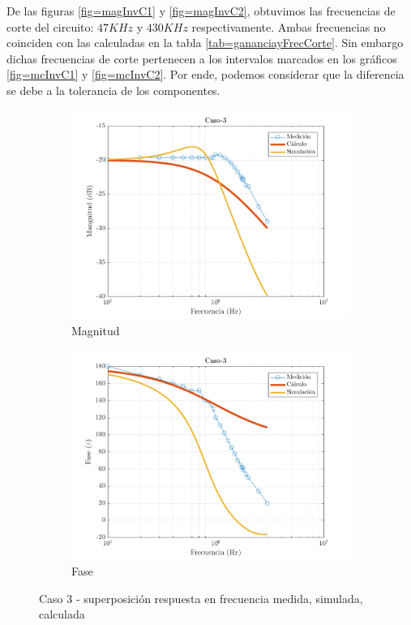 \documentclass[../../main.tex]{subfiles}
\begin{document}
De las figuras \ref{fig=magInvC1} y \ref{fig=magInvC2}, obtuvimos las frecuencias de corte del circuito: $47KHz$ y $430KHz$ respectivamente.  Ambas frecuencias no coinciden con las calculadas en la tabla \ref{tab=gananciayFrecCorte}. Sin embargo dichas frecuencias de corte pertenecen a los intervalos marcados en los gráficos \ref{fig=mcInvC1} y \ref{fig=mcInvC2}. Por ende, podemos considerar que la diferencia se debe a la tolerancia de los componentes.

\begin{figure}[H]
\centering
\begin{subfigure}[http]{0.49\textwidth}
\includegraphics[width=\textwidth]{imagenes/Caso-3_mag_inv.png}
\caption{Magnitud}\label{fig=magInvC3}
\end{subfigure}
\begin{subfigure}[http]{0.49\textwidth}
\includegraphics[width=\textwidth]{imagenes/Caso-3_fase_inv.png}
\caption{Fase} \label{fig=fasInvC3}
\end{subfigure}
\caption{Caso 3 - superposición respuesta en  frecuencia medida, simulada, calculada}
\end{figure}
\end{document}
